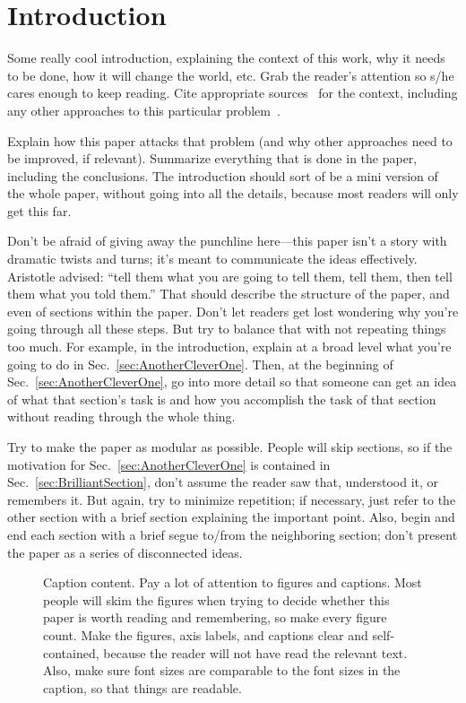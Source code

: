 \documentclass[reprint, aps, prd, letterpaper, noshowpacs, amsmath, %
amssymb, amsfonts, nofootinbib, floatfix, superscriptaddress, %
twoside]{revtex4-1}
\begin{document}
\section{Introduction}
\label{sec:Introduction}

Some really cool introduction, explaining the context of this work,
why it needs to be done, how it will change the world, etc.  Grab the
reader's attention so s/he cares enough to keep reading.  Cite
appropriate sources~\cite{MTW, Wald:1984} for the context, including
any other approaches to this particular
problem~\cite{doranlasenby:2003}.

Explain how this paper attacks that problem (and why other approaches
need to be improved, if relevant).  Summarize everything that is done
in the paper, including the conclusions.  The introduction should sort
of be a mini version of the whole paper, without going into all the
details, because most readers will only get this far.

Don't be afraid of giving away the punchline here---this paper isn't a
story with dramatic twists and turns; it's meant to communicate the
ideas effectively.  Aristotle advised: ``tell them what you are going
to tell them, tell them, then tell them what you told them.''  That
should describe the structure of the paper, and even of sections
within the paper.  Don't let readers get lost wondering why you're
going through all these steps.  But try to balance that with not
repeating things too much.  For example, in the introduction, explain
at a broad level what you're going to do in
Sec.~\ref{sec:AnotherCleverOne}.  Then, at the beginning of
Sec.~\ref{sec:AnotherCleverOne}, go into more detail so that someone
can get an idea of what that section's task is and how you accomplish
the task of that section without reading through the whole thing.

Try to make the paper as modular as possible.  People will skip
sections, so if the motivation for Sec.~\ref{sec:AnotherCleverOne} is
contained in Sec.~\ref{sec:BrilliantSection}, don't assume the reader
saw that, understood it, or remembers it.  But again, try to minimize
repetition; if necessary, just refer to the other section with a brief
section explaining the important point.  Also, begin and end each
section with a brief segue to/from the neighboring section; don't
present the paper as a series of disconnected ideas.


\begin{figure}
  \caption{ \label{fig:SomeFigure} %
     Caption content. Pay a lot of attention to
    figures and captions.  Most people will skim the figures when
    trying to decide whether this paper is worth reading and
    remembering, so make every figure count.  Make the figures, axis
    labels, and captions clear and self-contained, because the reader
    will not have read the relevant text.  Also, make sure font sizes
    are comparable to the font sizes in the caption, so that things
    are readable. %
  }
\end{figure}
\end{document}
